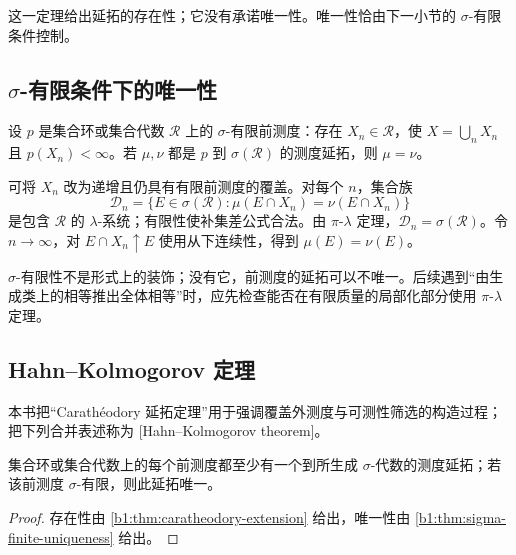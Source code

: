 这一定理给出延拓的存在性；它没有承诺唯一性。唯一性恰由下一小节的 \(\sigma\)-有限条件控制。

\subsection{\texorpdfstring{\(\sigma\)}{σ}-有限条件下的唯一性}
\label{b1:subsec:020403}

\begin{theorem}
\label{b1:thm:sigma-finite-uniqueness}
设 \(p\) 是集合环或集合代数 \(\mathcal R\) 上的 \(\sigma\)-有限前测度：存在 \(X_n\in\mathcal R\)，使 \(X=\bigcup_nX_n\) 且 \(p(X_n)<\infty\)。若 \(\mu,\nu\) 都是 \(p\) 到 \(\sigma(\mathcal R)\) 的测度延拓，则 \(\mu=\nu\)。
\end{theorem}
\begin{proofsketch}
可将 \(X_n\) 改为递增且仍具有有限前测度的覆盖。对每个 \(n\)，集合族
\[
\mathcal D_n
=\{E\in\sigma(\mathcal R):\mu(E\cap X_n)=\nu(E\cap X_n)\}
\]
是包含 \(\mathcal R\) 的 \(\lambda\)-系统；有限性使补集差公式合法。由 \(\pi\)-\(\lambda\) 定理，\(\mathcal D_n=\sigma(\mathcal R)\)。令 \(n\to\infty\)，对 \(E\cap X_n\uparrow E\) 使用从下连续性，得到 \(\mu(E)=\nu(E)\)。
\end{proofsketch}

\begin{remark}
\label{b1:rem:nonunique-extension}
\(\sigma\)-有限性不是形式上的装饰；没有它，前测度的延拓可以不唯一。后续遇到“由生成类上的相等推出全体相等”时，应先检查能否在有限质量的局部化部分使用 \(\pi\)-\(\lambda\) 定理。
\end{remark}

\subsection{Hahn–Kolmogorov 定理}
\label{b1:subsec:020404}

本书把“Carathéodory 延拓定理”用于强调覆盖外测度与可测性筛选的构造过程；把下列合并表述称为 [Hahn--Kolmogorov theorem]。

\begin{theorem}
\label{b1:thm:hahn-kolmogorov}
集合环或集合代数上的每个前测度都至少有一个到所生成 \(\sigma\)-代数的测度延拓；若该前测度 \(\sigma\)-有限，则此延拓唯一。
\end{theorem}
\begin{proof}
存在性由 \cref{b1:thm:caratheodory-extension} 给出，唯一性由 \cref{b1:thm:sigma-finite-uniqueness} 给出。
\end{proof}

